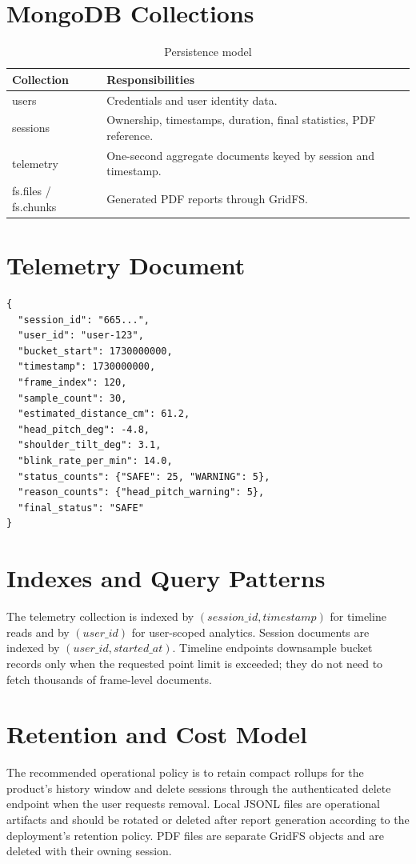 \documentclass[12pt,a4paper]{report}
\begin{document}
\section{MongoDB Collections}
\begin{table}[H]
\centering
\caption{Persistence model}
\begin{tabular}{p{}p{}}
\toprule
\textbf{Collection} & \textbf{Responsibilities}\\
\midrule
users & Credentials and user identity data.\\
sessions & Ownership, timestamps, duration, final statistics, PDF reference.\\
telemetry & One-second aggregate documents keyed by session and timestamp.\\
fs.files / fs.chunks & Generated PDF reports through GridFS.\\
\bottomrule
\end{tabular}
\end{table}

\section{Telemetry Document}
\begin{lstlisting}[language={},caption={Representative compact telemetry document}]
{
  "session_id": "665...",
  "user_id": "user-123",
  "bucket_start": 1730000000,
  "timestamp": 1730000000,
  "frame_index": 120,
  "sample_count": 30,
  "estimated_distance_cm": 61.2,
  "head_pitch_deg": -4.8,
  "shoulder_tilt_deg": 3.1,
  "blink_rate_per_min": 14.0,
  "status_counts": {"SAFE": 25, "WARNING": 5},
  "reason_counts": {"head_pitch_warning": 5},
  "final_status": "SAFE"
}
\end{lstlisting}

\section{Indexes and Query Patterns}
The telemetry collection is indexed by \((session\_id, timestamp)\) for
timeline reads and by \((user\_id)\) for user-scoped analytics. Session
documents are indexed by \((user\_id, started\_at)\). Timeline endpoints
downsample bucket records only when the requested point limit is exceeded;
they do not need to fetch thousands of frame-level documents.

\section{Retention and Cost Model}
The recommended operational policy is to retain compact rollups for the
product's history window and delete sessions through the authenticated delete
endpoint when the user requests removal. Local JSONL files are operational
artifacts and should be rotated or deleted after report generation according
to the deployment's retention policy. PDF files are separate GridFS objects
and are deleted with their owning session.
\end{document}
